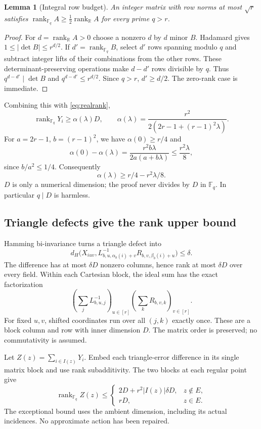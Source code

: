 \documentclass[11pt]{article}
\newtheorem{lemma}[theorem]{Lemma}
\theoremstyle{definition}
\DeclareMathOperator{\rank}{rank}
\newcommand{\F}{\mathbb F}
\newcommand{\R}{\mathbb R}
\begin{document}
\begin{lemma}[Integral row budget]\label{lem:reduction}
An integer matrix with row norms at most $\sqrt r$ satisfies
$\rank_{\F_q}A\ge\frac12\rank_\R A$ for every prime $q>r$.
\end{lemma}
\begin{proof}
For $d=\rank_\R A>0$ choose a nonzero $d$ by $d$ minor $B$.
Hadamard gives $1\le|\det B|\le r^{d/2}$.
If $d'=\rank_{\F_q}B$, select $d'$ rows spanning modulo $q$ and
subtract integer lifts of their combinations from the other rows.
These determinant-preserving operations make $d-d'$ rows divisible
by $q$. Thus $q^{d-d'}\mid\det B$ and
$q^{d-d'}\le r^{d/2}$. Since $q>r$, $d'\ge d/2$.
The zero-rank case is immediate.
\end{proof}

Combining this with \eqref{eq:realrank},
\[
 \rank_{\F_q}Y_i\ge\alpha(\lambda)D,\qquad
 \alpha(\lambda)=\frac{r^2}{2(2r-1+(r-1)^2\lambda)}.
\]
For $a=2r-1$, $b=(r-1)^2$, we have $\alpha(0)\ge r/4$ and
\[
 \alpha(0)-\alpha(\lambda)
 =\frac{r^2b\lambda}{2a(a+b\lambda)}
 \le\frac{r^2\lambda}{8},
\]
since $b/a^2\le1/4$. Consequently
\begin{equation}\label{eq:alphaloss}
 \alpha(\lambda)\ge r/4-r^2\lambda/8.
\end{equation}
$D$ is only a numerical dimension; the proof never divides by $D$
in $\F_q$. In particular $q\mid D$ is harmless.

\subsection{Triangle defects give the rank upper bound}
Hamming bi-invariance turns a triangle defect into
\[
 d_H\bigl(X_{iuv},
 L_{b,u,\alpha_b(i)+v}^{-1}R_{b,v,\beta_b(i)+u}\bigr)\le\delta.
\]
The difference has at most $\delta D$ nonzero columns, hence rank
at most $\delta D$ over every field. Within each Cartesian block,
the ideal sum has the exact factorization
\[
 \left(\sum_jL_{b,u,j}^{-1}\right)_{u\in[r]}
 \left(\sum_kR_{b,v,k}\right)_{v\in[r]}.
\]
For fixed $u,v$, shifted coordinates run over all $(j,k)$ exactly
once. These are a block column and row with inner dimension $D$.
The matrix order is preserved; no commutativity is assumed.

Let $Z(z)=\sum_{i\in I(z)}Y_i$. Embed each triangle-error difference
in its single matrix block and use rank subadditivity. The two blocks
at each regular point give
\begin{equation}\label{eq:localrank}
 \rank_{\F_q}Z(z)\le
 \begin{cases}
 2D+r^2|I(z)|\delta D,&z\notin E,\\
 rD,&z\in E.
 \end{cases}
\end{equation}
The exceptional bound uses the ambient dimension, including its
actual incidences. No approximate action has been repaired.
\end{document}
